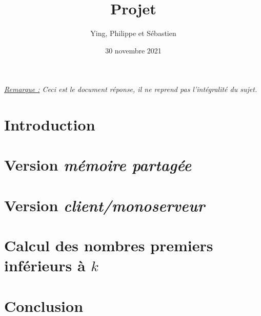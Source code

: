 \documentclass{sebaClass}
\title{Projet}
\author{Ying, Philippe et Sébastien}
\date{30 novembre 2021}
\begin{document}
\maketitle
\tableofcontents

\vspace*{\fill}
\textit{\underline{Remarque :} Ceci est le document réponse, il ne reprend pas l'intégralité du sujet.}
\newpage

\section{Introduction}


\section{Version \textit{mémoire partagée}}


\section{Version \textit{client/monoserveur}}


\section{Calcul des nombres premiers inférieurs à \(k\)}


\section{Conclusion}

\end{document}

